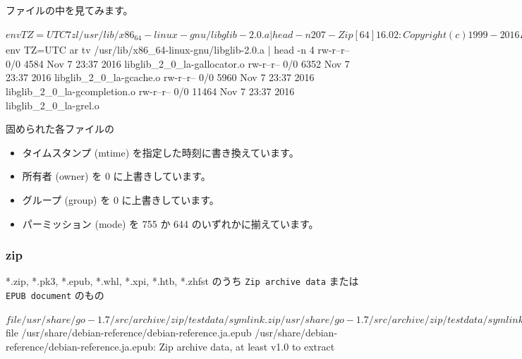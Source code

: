 \documentclass[mingoth,a4paper]{jsarticle}
\begin{document}
ファイルの中を見てみます。
\begin{commandline}
$ env TZ=UTC 7z l /usr/lib/x86_64-linux-gnu/libglib-2.0.a | head -n 20

7-Zip [64] 16.02 : Copyright (c) 1999-2016 Igor Pavlov : 2016-05-21
p7zip Version 16.02 (locale=ja_JP.UTF-8,Utf16=on,HugeFiles=on,64 bits,4 CPUs Intel(R) Core(TM) i5-4250U CPU @ 1.30GHz (40651),ASM,AES-NI)

Scanning the drive for archives:
1 file, 1973536 bytes (1928 KiB)

Listing archive: /usr/lib/x86_64-linux-gnu/libglib-2.0.a

--
Path = /usr/lib/x86_64-linux-gnu/libglib-2.0.a
Type = Ar
Physical Size = 1973536
SubType = a

   Date      Time    Attr         Size   Compressed  Name
------------------- ----- ------------ ------------  ------------------------
2016-11-07 23:37:05 .....        84550        84550  1.txt
2016-11-07 23:37:05 .....         4584         4584  libglib_2_0_la-gallocator.o
2016-11-07 23:37:05 .....         6352         6352  libglib_2_0_la-gcache.o
$ env TZ=UTC ar tv /usr/lib/x86_64-linux-gnu/libglib-2.0.a | head -n 4
rw-r--r-- 0/0   4584 Nov  7 23:37 2016 libglib_2_0_la-gallocator.o
rw-r--r-- 0/0   6352 Nov  7 23:37 2016 libglib_2_0_la-gcache.o
rw-r--r-- 0/0   5960 Nov  7 23:37 2016 libglib_2_0_la-gcompletion.o
rw-r--r-- 0/0  11464 Nov  7 23:37 2016 libglib_2_0_la-grel.o
\end{commandline}

固められた各ファイルの
\begin{itemize}
 \item タイムスタンプ (mtime) を指定した時刻に書き換えています。
 \item 所有者 (owner) を 0 に上書きしています。
 \item グループ (group) を 0 に上書きしています。
 \item パーミッション (mode) を 755 か 644 のいずれかに揃えています。
\end{itemize}

\subsubsection{zip}

*.zip, *.pk3, *.epub, *.whl, *.xpi, *.htb, *.zhfst のうち \verb|Zip archive data|
または \verb|EPUB document| のもの

\begin{commandline}
$ file /usr/share/go-1.7/src/archive/zip/testdata/symlink.zip
/usr/share/go-1.7/src/archive/zip/testdata/symlink.zip: Zip archive data, at least v1.0 to extract
$ file /usr/share/debian-reference/debian-reference.ja.epub
/usr/share/debian-reference/debian-reference.ja.epub: Zip archive data, at least v1.0 to extract
\end{commandline}
\end{document}
